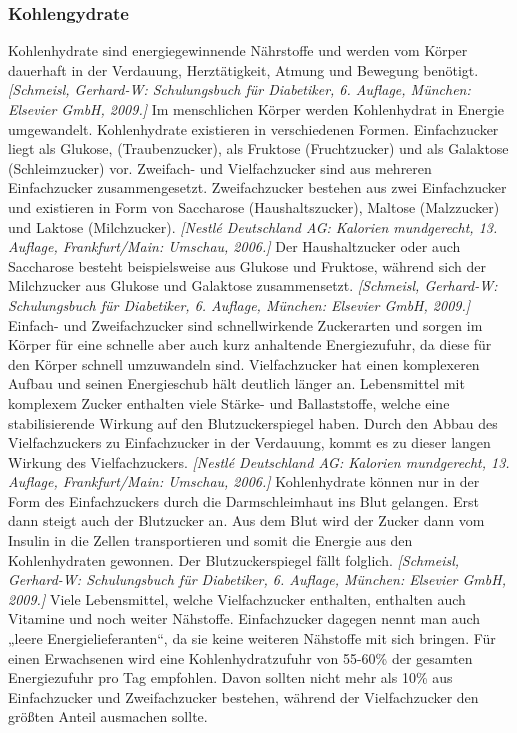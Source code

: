 \documentclass[a4paper,11pt]{article}%
\renewcommand{\\}{\vspace*{0.5\baselineskip} \newline}
\begin{document}
	\subsubsection{Kohlengydrate}
		Kohlenhydrate sind energiegewinnende Nährstoffe und werden vom Körper dauerhaft in der Verdauung, Herztätigkeit, Atmung und Bewegung benötigt. \emph{[Schmeisl, Gerhard-W: Schulungsbuch für Diabetiker, 6. Auflage, München: Elsevier GmbH, 2009.]} Im menschlichen Körper werden Kohlenhydrat in Energie umgewandelt. Kohlenhydrate existieren in verschiedenen Formen. Einfachzucker liegt als Glukose, (Traubenzucker), als Fruktose (Fruchtzucker) und als Galaktose (Schleimzucker) vor. Zweifach- und Vielfachzucker sind aus mehreren Einfachzucker zusammengesetzt. Zweifachzucker bestehen aus zwei Einfachzucker und existieren in Form von Saccharose (Haushaltszucker), Maltose (Malzzucker) und Laktose (Milchzucker). \emph{[Nestlé Deutschland AG: Kalorien mundgerecht, 13. Auflage, Frankfurt/Main: Umschau, 2006.]} Der Haushaltzucker oder auch Saccharose besteht beispielsweise aus Glukose und Fruktose, während sich der Milchzucker aus Glukose und Galaktose zusammensetzt. \emph{[Schmeisl, Gerhard-W: Schulungsbuch für Diabetiker, 6. Auflage, München: Elsevier GmbH, 2009.]} Einfach- und Zweifachzucker sind schnellwirkende Zuckerarten und sorgen im Körper für eine schnelle aber auch kurz anhaltende Energiezufuhr, da diese für den Körper schnell umzuwandeln sind. Vielfachzucker hat einen komplexeren Aufbau und seinen Energieschub hält deutlich länger an. Lebensmittel mit komplexem Zucker enthalten viele Stärke- und Ballaststoffe, welche eine stabilisierende Wirkung auf den Blutzuckerspiegel haben. Durch den Abbau des Vielfachzuckers zu Einfachzucker in der Verdauung, kommt es zu dieser langen Wirkung des Vielfachzuckers. \emph{[Nestlé Deutschland AG: Kalorien mundgerecht, 13. Auflage, Frankfurt/Main: Umschau, 2006.]} Kohlenhydrate können nur in der Form des Einfachzuckers durch die Darmschleimhaut ins Blut gelangen. Erst dann steigt auch der Blutzucker an. Aus dem Blut wird der Zucker dann vom Insulin in die Zellen transportieren und somit die Energie aus den Kohlenhydraten gewonnen. Der Blutzuckerspiegel fällt folglich. \emph{[Schmeisl, Gerhard-W: Schulungsbuch für Diabetiker, 6. Auflage, München: Elsevier GmbH, 2009.]} \newline
		Viele Lebensmittel, welche Vielfachzucker enthalten, enthalten auch Vitamine und noch weiter Nähstoffe. Einfachzucker dagegen nennt man auch „leere Energielieferanten“, da sie keine weiteren Nähstoffe mit sich bringen. Für einen Erwachsenen wird eine Kohlenhydratzufuhr von 55-60\% der gesamten Energiezufuhr pro Tag empfohlen. Davon sollten nicht mehr als 10\% aus Einfachzucker und Zweifachzucker bestehen, während der Vielfachzucker den größten Anteil ausmachen sollte. \newline
\end{document}

